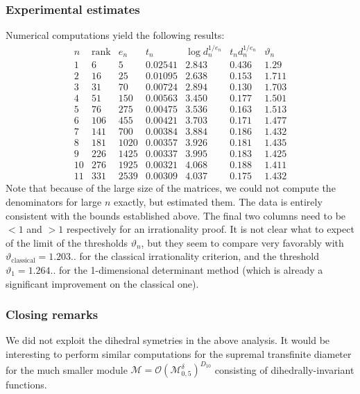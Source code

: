 \documentclass[a4paper,10pt]{amsart}
\theoremstyle{definition}
\theoremstyle{remark}
\numberwithin{equation}{section}
\newcommand{\Or}{\mathcal{O}}
\newcommand{\0}{\color{blue}{\mathsf{0}}}
\begin{document}
\subsubsection{Experimental estimates}
Numerical computations yield the following results:
\[
\begin{array}{c|cccccc}
 n  & \mathrm{rank} & e_n   & t_n & \log d^{1/e_n}_n   &  t_n d_n^{1/e_n} & \vartheta_n   \\ \hline
1    & 6 &  5  &  0.02541  &    2.843  &  0.436  &  1.29 \\
 2 & 16&  25 &  0.01095 & 2.638 &  0.153  &     1.711 \\
 3 & 31 & 70   &  0.00724   & 2.894  & 0.130  &  1.703 \\
 4 &  51& 150    &  0.00563   &   3.450     & 0.177  &  1.501 \\ 
 5 &  76& 275    &      0.00475            &   3.536     & 0.163  &   1.513 \\ 
 6 &  106 & 455  &         0.00421         &      3.703   &  0.171 &  1.477  \\ 
 7 &  141 & 700  &     0.00384    &    3.884      &  0.186 &    1.432 \\ 
 8 &  181 & 1020  &      0.00357            &  3.926     & 0.181  &  1.435 \\ 
 9 &    226 & 1425&          0.00337        &     3.995  &    0.183 &  1.425 \\ 
 10 &   276 & 1925   &        0.00321          &     4.068    &  0.188 & 1.411 \\ 
 11 &    331 & 2539  &       0.00309           &      4.037   &  0.175 & 1.432
  \end{array}
\]
Note that because of the large size of the matrices, we could not compute the  denominators for large $n$  exactly, but estimated them. The data is entirely consistent with the bounds established above.
The final two columns need to be $<1$ and $>1$ respectively for an irrationality proof. 
It is not clear what to expect of the limit of the  thresholds  $\vartheta_n$, but they seem to compare  very favorably with $\vartheta_{\mathrm{classical}} = 1.203..$ for the classical irrationality criterion, and the threshold  $\vartheta_1=1.264..$ for the 1-dimensional determinant method (which is already  a significant improvement on the classical one).



\subsubsection{Closing remarks}
We did not exploit the dihedral symetries in the above analysis. It would be interesting to perform similar  computations for the   supremal transfinite diameter for the much smaller module $\mathcal{M}= \Or(\mathcal{M}_{0,5}^{\delta})^{D_{10}}$ consisting of  dihedrally-invariant functions.
\end{document}
